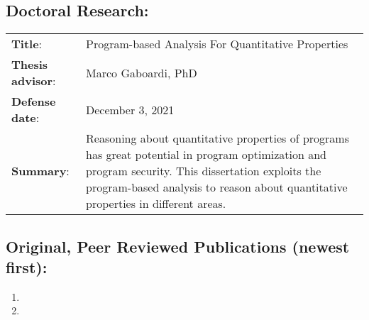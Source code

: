 \documentclass[12pt, letterpaper]{report}   %
\begin{document}
\subsection*{Doctoral Research:}
\begin{tabular}{p{}p{}}
\textbf{Title}: & Program-based Analysis For Quantitative Properties \\
\textbf{Thesis advisor}: & Marco Gaboardi, PhD\\
\textbf{Defense date}: & December 3, 2021 \\
\textbf{Summary}: & Reasoning about quantitative properties of programs has great potential in program optimization and program security. This dissertation exploits the program-based analysis to reason about quantitative properties in different areas.
\\
\end{tabular}

\subsection*{Original, Peer Reviewed Publications (newest first):}
\begin{enumerate}
\item 
\item 
\end{enumerate}
\end{document}
